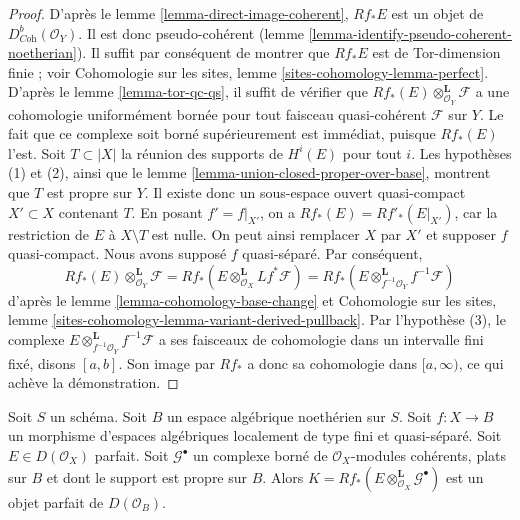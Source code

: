 \begin{proof}
D'apr\`es le lemme \ref{lemma-direct-image-coherent}, $Rf_*E$ est un objet de
$D^b_{\textit{Coh}}(\mathcal{O}_Y)$. Il est donc pseudo-coh\'erent
(lemme \ref{lemma-identify-pseudo-coherent-noetherian}). Il suffit par
cons\'equent de montrer que $Rf_*E$ est de Tor-dimension finie ; voir
Cohomologie sur les sites, lemme \ref{sites-cohomology-lemma-perfect}.
D'apr\`es le lemme \ref{lemma-tor-qc-qs}, il suffit de v\'erifier que
$Rf_*(E)\otimes_{\mathcal{O}_Y}^\mathbf{L}\mathcal{F}$ a une cohomologie
uniform\'ement born\'ee pour tout faisceau quasi-coh\'erent $\mathcal{F}$ sur
$Y$. Le fait que ce complexe soit born\'e sup\'erieurement est imm\'ediat, puisque
$Rf_*(E)$ l'est. Soit $T\subset |X|$ la r\'eunion des supports de $H^i(E)$ pour
tout $i$. Les hypoth\`eses (1) et (2), ainsi que le lemme
\ref{lemma-union-closed-proper-over-base}, montrent que $T$ est propre
sur $Y$. Il existe donc un sous-espace ouvert quasi-compact
$X'\subset X$ contenant $T$. En posant $f'=f|_{X'}$, on a
$Rf_*(E)=Rf'_*(E|_{X'})$, car la restriction de $E$ \`a $X\setminus T$ est
nulle. On peut ainsi remplacer $X$ par $X'$ et supposer $f$ quasi-compact.
Nous avons suppos\'e $f$ quasi-s\'epar\'e. Par cons\'equent,
$$
Rf_*(E) \otimes_{\mathcal{O}_Y}^\mathbf{L} \mathcal{F} =
Rf_*\left(E \otimes_{\mathcal{O}_X}^\mathbf{L} Lf^*\mathcal{F}\right) =
Rf_*\left(E \otimes_{f^{-1}\mathcal{O}_Y}^\mathbf{L} f^{-1}\mathcal{F}\right)
$$
d'apr\`es le lemme \ref{lemma-cohomology-base-change} et Cohomologie sur les
sites, lemme \ref{sites-cohomology-lemma-variant-derived-pullback}.
Par l'hypoth\`ese (3), le complexe
$E\otimes_{f^{-1}\mathcal{O}_Y}^\mathbf{L}f^{-1}\mathcal{F}$ a ses faisceaux
de cohomologie dans un intervalle fini fix\'e, disons $[a,b]$. Son image par
$Rf_*$ a donc sa cohomologie dans $[a,\infty)$, ce qui ach\`eve la d\'emonstration.
\end{proof}

\begin{lemma}
\label{lemma-tensor-perfect}
Soit $S$ un sch\'ema. Soit $B$ un espace alg\'ebrique noeth\'erien sur $S$.
Soit $f:X\to B$ un morphisme d'espaces alg\'ebriques localement de type fini
et quasi-s\'epar\'e. Soit $E\in D(\mathcal{O}_X)$ parfait. Soit
$\mathcal{G}^\bullet$ un complexe born\'e de $\mathcal{O}_X$-modules coh\'erents,
plats sur $B$ et dont le support est propre sur $B$. Alors
$K=Rf_*(E\otimes^\mathbf{L}_{\mathcal{O}_X}\mathcal{G}^\bullet)$ est un objet
parfait de $D(\mathcal{O}_B)$.
\end{lemma}


